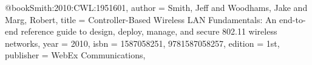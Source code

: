 @book{Smith:2010:CWL:1951601,
 author = {Smith, Jeff and Woodhams, Jake and Marg, Robert},
 title = {Controller-Based Wireless LAN Fundamentals: An end-to-end reference guide to design, deploy, manage, and secure 802.11 wireless networks},
 year = {2010},
 isbn = {1587058251, 9781587058257},
 edition = {1st},
 publisher = {WebEx Communications},
}